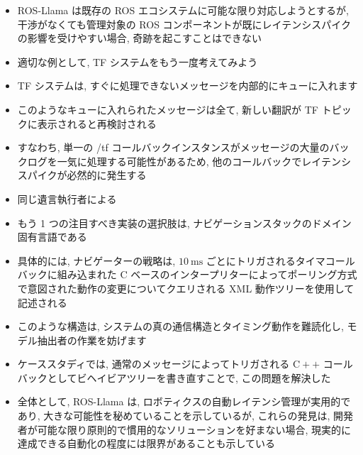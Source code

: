 \begin{frame}{}
    \begin{itemize}
        \item ROS-Llama は既存の ROS エコシステムに可能な限り対応しようとするが, 干渉がなくても管理対象の ROS コンポーネントが既にレイテンシスパイクの影響を受けやすい場合, 奇跡を起こすことはできない
\item 適切な例として, TF システムをもう一度考えてみよう
\item TF システムは, すぐに処理できないメッセージを内部的にキューに入れます
\item このようなキューに入れられたメッセージは全て, 新しい翻訳が TF トピックに表示されると再検討される
\item すなわち, 単一の /tf コールバックインスタンスがメッセージの大量のバックログを一気に処理する可能性があるため, 他のコールバックでレイテンシスパイクが必然的に発生する
\item 同じ遺言執行者による
    \end{itemize}
\end{frame}

\begin{frame}{}
    \begin{itemize}
        \item もう 1 つの注目すべき実装の選択肢は, ナビゲーションスタックのドメイン固有言語である
\item 具体的には, ナビゲーターの戦略は, $10 \mathrm{~ms}$ ごとにトリガされるタイマコールバックに組み込まれた C ベースのインタープリターによってポーリング方式で意図された動作の変更についてクエリされる XML 動作ツリーを使用して記述される
\item このような構造は, システムの真の通信構造とタイミング動作を難読化し, モデル抽出者の作業を妨げます
\item ケーススタディでは, 通常のメッセージによってトリガされる $\mathrm{C}++$ コールバックとしてビヘイビアツリーを書き直すことで, この問題を解決した
    \end{itemize}
\end{frame}

\begin{frame}{}
    \begin{itemize}
        \item 全体として, ROS-Llama は, ロボティクスの自動レイテンシ管理が実用的であり, 大きな可能性を秘めていることを示しているが, これらの発見は, 開発者が可能な限り原則的で慣用的なソリューションを好まない場合, 現実的に達成できる自動化の程度には限界があることも示している
    \end{itemize}
\end{frame}
